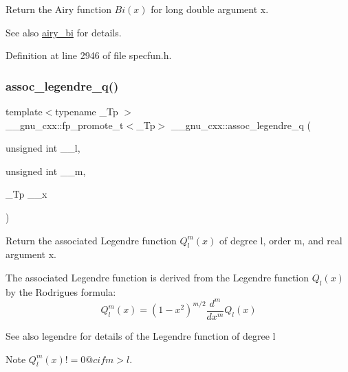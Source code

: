 Return the Airy function $ Bi(x) $ for {\ttfamily long double} argument {\ttfamily x}.

\begin{DoxySeeAlso}{See also}
\hyperlink{group__mathsf__gnu_ga33c172cab7f8e9c99537444c7e30801a}{airy\+\_\+bi} for details. 
\end{DoxySeeAlso}


Definition at line 2946 of file specfun.\+h.

\mbox{\label{group__mathsf__gnu_ga96a1223727fa71ffbf520a98ac3dc885}} 
\subsubsection{\texorpdfstring{assoc\+\_\+legendre\+\_\+q()}{assoc\_legendre\_q()}}
{\footnotesize\ttfamily template$<$typename \+\_\+\+Tp $>$ \\
\+\_\+\+\_\+gnu\+\_\+cxx\+::fp\+\_\+promote\+\_\+t$<$\+\_\+\+Tp$>$ \+\_\+\+\_\+gnu\+\_\+cxx\+::assoc\+\_\+legendre\+\_\+q (\begin{DoxyParamCaption}\item[{unsigned int}]{\+\_\+\+\_\+l,  }\item[{unsigned int}]{\+\_\+\+\_\+m,  }\item[{\+\_\+\+Tp}]{\+\_\+\+\_\+x }\end{DoxyParamCaption})\hspace{0.3cm}{\ttfamily [inline]}}

Return the associated Legendre function $ Q_l^m(x) $ of degree {\ttfamily l}, order {\ttfamily m}, and real argument {\ttfamily x}.

The associated Legendre function is derived from the Legendre function $ Q_l(x) $ by the Rodrigues formula\+: \[ Q_l^m(x) = (1 - x^2)^{m/2}\frac{d^m}{dx^m}Q_l(x) \] \begin{DoxySeeAlso}{See also}
legendre for details of the Legendre function of degree {\ttfamily l} 
\end{DoxySeeAlso}
\begin{DoxyNote}{Note}
$ Q_l^m(x) != 0 @c if m > l $.
\end{DoxyNote}

